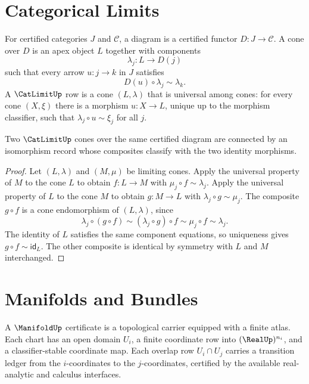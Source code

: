 \section{Categorical Limits}
\label{sec:geometry-spine-catlimit}

\begin{definition}
\label{def:geometry-spine-catlimit}
For certified categories $J$ and $\mathcal C$, a diagram is a certified
functor $D:J\to\mathcal C$.  A cone over $D$ is an apex object $L$ together
with components
$$
\lambda_j:L\to D(j)
$$
such that every arrow $u:j\to k$ in $J$ satisfies
$$
D(u)\circ\lambda_j\sim\lambda_k.
$$
A $\CatLimitUp$ row is a cone $(L,\lambda)$ that is universal among cones:
for every cone $(X,\xi)$ there is a morphism $u:X\to L$, unique up to the
morphism classifier, such that $\lambda_j\circ u\sim\xi_j$ for all $j$.
\end{definition}

\begin{theorem}
\label{thm:geometry-spine-limit-comparison}
Two $\CatLimitUp$ cones over the same certified diagram are connected by an
isomorphism record whose composites classify with the two identity morphisms.
\end{theorem}

\begin{proof}
Let $(L,\lambda)$ and $(M,\mu)$ be limiting cones.  Apply the universal
property of $M$ to the cone $L$ to obtain $f:L\to M$ with
$\mu_j\circ f\sim\lambda_j$.  Apply the universal property of $L$ to the cone
$M$ to obtain $g:M\to L$ with $\lambda_j\circ g\sim\mu_j$.  The composite
$g\circ f$ is a cone endomorphism of $(L,\lambda)$, since
$$
\lambda_j\circ(g\circ f)
\sim
(\lambda_j\circ g)\circ f
\sim
\mu_j\circ f
\sim
\lambda_j.
$$
The identity of $L$ satisfies the same component equations, so uniqueness
gives $g\circ f\sim\mathsf{id}_L$.  The other composite is identical by
symmetry with $L$ and $M$ interchanged.
\end{proof}

\section{Manifolds and Bundles}
\label{sec:geometry-spine-manifold-bundle}

\begin{definition}
\label{def:geometry-spine-manifold}
A $\ManifoldUp$ certificate is a topological carrier equipped with a finite
atlas.  Each chart has an open domain $U_i$, a finite coordinate row into
$(\RealUp)^{n_i}$, and a classifier-stable coordinate map.  Each overlap row
$U_i\cap U_j$ carries a transition ledger from the $i$-coordinates to the
$j$-coordinates, certified by the available real-analytic and calculus
interfaces.
\end{definition}

